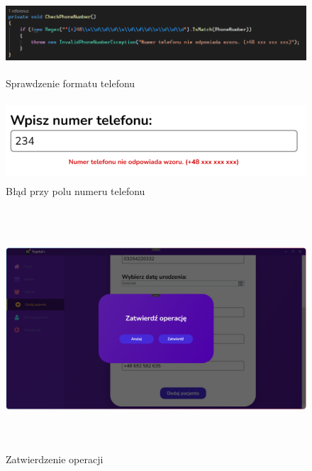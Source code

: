 \begin{figure}[H]
\begin{center}
    \includegraphics[height=3cm]{images/sprawd_telef.png}
    \caption{Sprawdzenie formatu telefonu}
\end{center}
\end{figure}

\begin{figure}[H]
    \begin{center}
    \includegraphics[height=3cm]{images/blad_telef.png}
    \caption{Błąd przy polu numeru telefonu}
\end{center}
\end{figure}

\begin{figure}[H]
\begin{center}
    \includegraphics[height=9cm]{images/zatwr_oper_dod.png}
    \caption{Zatwierdzenie operacji}
\end{center}
\end{figure}

